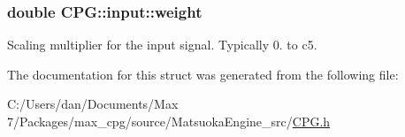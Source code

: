 \subsubsection[{\texorpdfstring{weight}{weight}}]{\setlength{\rightskip}{0pt plus 5cm}double C\+P\+G\+::input\+::weight}\hypertarget{structCPG_1_1input_a866947e5b7bc9ab1005a2ca72713450c}{}\label{structCPG_1_1input_a866947e5b7bc9ab1005a2ca72713450c}
Scaling multiplier for the input signal. Typically 0. to c5. 

The documentation for this struct was generated from the following file\+:\begin{DoxyCompactItemize}
\item 
C\+:/\+Users/dan/\+Documents/\+Max 7/\+Packages/max\+\_\+cpg/source/\+Matsuoka\+Engine\+\_\+src/\hyperlink{CPG_8h}{C\+P\+G.\+h}\end{DoxyCompactItemize}
